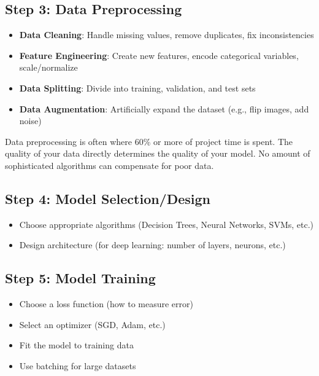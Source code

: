 \subsection{Step 3: Data Preprocessing}

\begin{itemize}
    \item \textbf{Data Cleaning}: Handle missing values, remove duplicates, fix inconsistencies
    \item \textbf{Feature Engineering}: Create new features, encode categorical variables, scale/normalize
    \item \textbf{Data Splitting}: Divide into training, validation, and test sets
    \item \textbf{Data Augmentation}: Artificially expand the dataset (e.g., flip images, add noise)
\end{itemize}

\begin{bluebox}
Data preprocessing is often where 60\% or more of project time is spent. The quality of your data directly determines the quality of your model. No amount of sophisticated algorithms can compensate for poor data.
\end{bluebox}

\subsection{Step 4: Model Selection/Design}

\begin{itemize}
    \item Choose appropriate algorithms (Decision Trees, Neural Networks, SVMs, etc.)
    \item Design architecture (for deep learning: number of layers, neurons, etc.)
\end{itemize}

\subsection{Step 5: Model Training}

\begin{itemize}
    \item Choose a loss function (how to measure error)
    \item Select an optimizer (SGD, Adam, etc.)
    \item Fit the model to training data
    \item Use batching for large datasets
\end{itemize}

